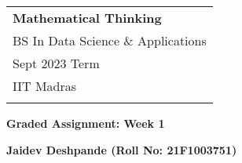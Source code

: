 \documentclass[a4paper,12pt]{article} %
\begin{document}
\thispagestyle{empty} %

\begin{tabular}{p{15.5cm}} %
{\large \bf Mathematical Thinking} \\
BS In Data Science \& Applications  \\ Sept 2023 Term  \\ IIT Madras\\
\hline %
\\
\end{tabular} %

\vspace*{0.3cm} %

\begin{center} %
	{\Large \bf Graded Assignment: Week 1} %
	\vspace{2mm}
	
	{\bf Jaidev Deshpande (Roll No: 21F1003751)} %
		
\end{center}  

\vspace{0.4cm}
\end{document}
